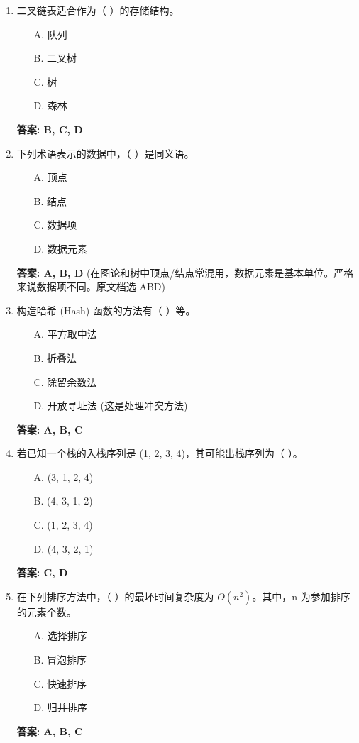 \documentclass[12pt, a4paper]{article}
\begin{document}
\begin{enumerate}
    \item 二叉链表适合作为（ ）的存储结构。
    \begin{enumerate}
        \item[A.] 队列
        \item[B.] 二叉树
        \item[C.] 树
        \item[D.] 森林
    \end{enumerate}
    \textbf{答案: B, C, D}

    \item 下列术语表示的数据中，（ ）是同义语。
    \begin{enumerate}
        \item[A.] 顶点
        \item[B.] 结点
        \item[C.] 数据项
        \item[D.] 数据元素
    \end{enumerate}
    \textbf{答案: A, B, D} (在图论和树中顶点/结点常混用，数据元素是基本单位。严格来说数据项不同。原文档选 ABD)

    \item 构造哈希 (Hash) 函数的方法有（ ）等。
    \begin{enumerate}
        \item[A.] 平方取中法
        \item[B.] 折叠法
        \item[C.] 除留余数法
        \item[D.] 开放寻址法 (这是处理冲突方法)
    \end{enumerate}
    \textbf{答案: A, B, C}

    \item 若已知一个栈的入栈序列是 (1, 2, 3, 4)，其可能出栈序列为（ ）。
    \begin{enumerate}
        \item[A.] (3, 1, 2, 4)
        \item[B.] (4, 3, 1, 2)
        \item[C.] (1, 2, 3, 4)
        \item[D.] (4, 3, 2, 1)
    \end{enumerate}
    \textbf{答案: C, D}

    \item 在下列排序方法中，（ ）的最坏时间复杂度为 $O(n^2)$。其中，n 为参加排序的元素个数。
    \begin{enumerate}
        \item[A.] 选择排序
        \item[B.] 冒泡排序
        \item[C.] 快速排序
        \item[D.] 归并排序
    \end{enumerate}
    \textbf{答案: A, B, C}


\end{enumerate}
\end{document}
